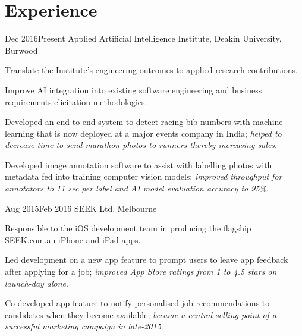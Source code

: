 \vspace{-1.5mm}
\section{Experience}
\vspace{3mm}

\def \asis{A\textsuperscript{2}I\textsuperscript{2}}

{Dec 2016}{Present}
{Applied Artificial Intelligence Institute, Deakin University, Burwood}
{
  \item Translate the Institute's engineering outcomes to applied research contributions.
  \item Improve AI integration into existing software engineering and business requirements elicitation methodologies.
}
{
  \item Developed an end-to-end system to detect racing bib numbers with machine learning that is now deployed at a major events company in India; \textit{helped to decrease time to send marathon photos to runners thereby increasing sales}.
  \item Developed image annotation software to assist with labelling photos with metadata fed into training computer vision models; \textit{improved throughput for annotators to 11 sec per label and AI model evaluation accuracy to 95\%}.
}

{Aug 2015}{Feb 2016}
{SEEK Ltd, Melbourne}
{
  \item Responsible to the iOS development team in producing the flagship SEEK.com.au iPhone and iPad apps.
}
{
  \item Led development on a new app feature to prompt users to leave app feedback after applying for a job; \textit{improved App Store ratings from 1  to 4.5 stars on launch-day alone}.
  \item Co-developed app feature to notify personalised job recommendations to candidates when they become available; \textit{became a central selling-point of a successful marketing campaign in late-2015}.
}

